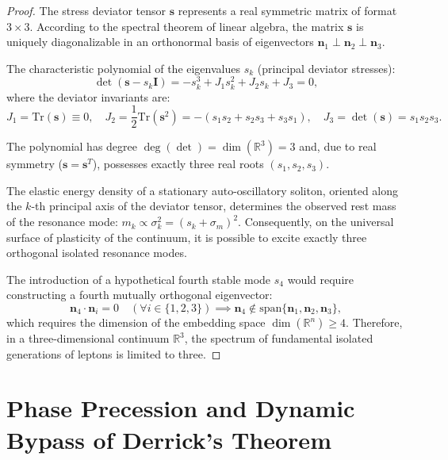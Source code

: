 \documentclass[12pt,a4paper]{article}
\begin{document}
	\begin{proof}
	The stress deviator tensor $\mathbf{s}$ represents a real symmetric matrix of format $3 \times 3$. According to the spectral theorem of linear algebra, the matrix $\mathbf{s}$ is uniquely diagonalizable in an orthonormal basis of eigenvectors $\mathbf{n}_1 \perp \mathbf{n}_2 \perp \mathbf{n}_3$.
		
	The characteristic polynomial of the eigenvalues $s_k$ (principal deviator stresses):
	\begin{equation}
		\det(\mathbf{s} - s_k \mathbf{I}) = -s_k^3 + J_1 s_k^2 + J_2 s_k + J_3 = 0,
	\end{equation}
	where the deviator invariants are:
	\begin{equation}
	J_1 = \mathrm{Tr}(\mathbf{s}) \equiv 0, \quad J_2 = \frac{1}{2}\mathrm{Tr}(\mathbf{s}^2) = -(s_1 s_2 + s_2 s_3 + s_3 s_1), \quad J_3 = \det(\mathbf{s}) = s_1 s_2 s_3.
	\end{equation}
		
	The polynomial has degree $\deg(\det) = \dim(\mathbb{R}^3) = 3$ and, due to real symmetry ($\mathbf{s} = \mathbf{s}^T$), possesses exactly three real roots $(s_1, s_2, s_3)$.
		
	The elastic energy density of a stationary auto-oscillatory soliton, oriented along the $k$-th principal axis of the deviator tensor, determines the observed rest mass of the resonance mode: $m_k \propto \sigma_k^2 = (s_k + \sigma_m)^2$. Consequently, on the universal surface of plasticity of the continuum, it is possible to excite exactly three orthogonal isolated resonance modes.
		
	The introduction of a hypothetical fourth stable mode $s_4$ would require constructing a fourth mutually orthogonal eigenvector:
	\begin{equation}
	\mathbf{n}_4 \cdot \mathbf{n}_i = 0 \quad (\forall i \in \{1, 2, 3\}) \implies \mathbf{n}_4 \notin \mathrm{span}\{\mathbf{n}_1, \mathbf{n}_2, \mathbf{n}_3\},
	\end{equation}
	which requires the dimension of the embedding space $\dim(\mathbb{R}^n) \ge 4$. Therefore, in a three-dimensional continuum $\mathbb{R}^3$, the spectrum of fundamental isolated generations of leptons is limited to three.
	\end{proof}
	
	\section{Phase Precession and Dynamic Bypass of Derrick's Theorem}
	
\end{document}
